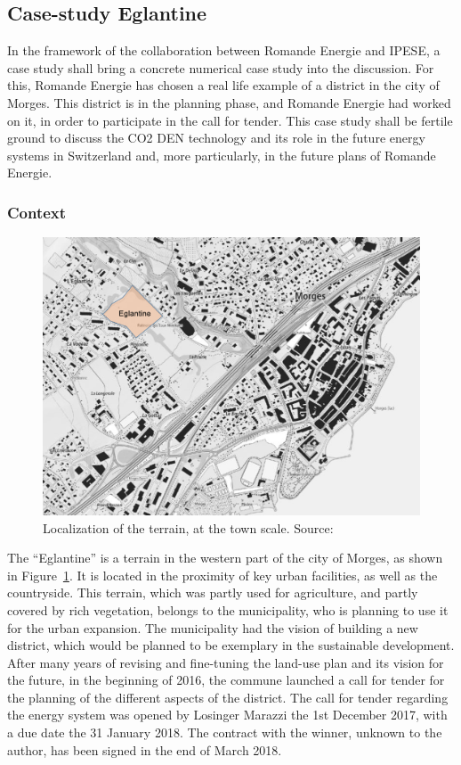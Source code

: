 \documentclass{article}
\begin{document}
\subsection{Case-study Eglantine}\label{ss:Eglantine}
In the framework of the collaboration between Romande Energie and IPESE, a case study shall bring a concrete numerical case study into the discussion. For this, Romande Energie has chosen a real life example of a district in the city of Morges. This district is in the planning phase, and Romande Energie had worked on it, in order to participate in the call for tender. This case study shall be fertile ground to discuss the CO2 DEN technology and its role in the future energy systems in Switzerland and, more particularly, in the future plans of Romande Energie.

\subsubsection{Context}

\begin{figure}[htp]
\centering
\includegraphics[width=1\textwidth]{morges.png}
\caption{Localization of the terrain, at the town scale. Source:~\cite{GuichetCartographiqueEtat}}
\label{fig:morges}
\end{figure}

The “Eglantine” is a terrain in the western part of the city of Morges, as shown in Figure~\ref{fig:morges}. It is located in the proximity of key urban facilities, as well as the countryside. This terrain, which was partly used for agriculture, and partly covered by rich vegetation, belongs to the municipality, who is planning to use it for the urban expansion. The municipality had the vision of building a new district, which would be planned to be exemplary in the sustainable development. After many years of revising and fine-tuning the land-use plan and its vision for the future, in the beginning of 2016, the commune launched a call for tender for the planning of the different aspects of the district. The call for tender regarding the energy system was opened by Losinger Marazzi the 1st December 2017, with a due date the 31 January 2018. The contract with the winner, unknown to the author, has been signed in the end of March 2018. \\
\end{document}
